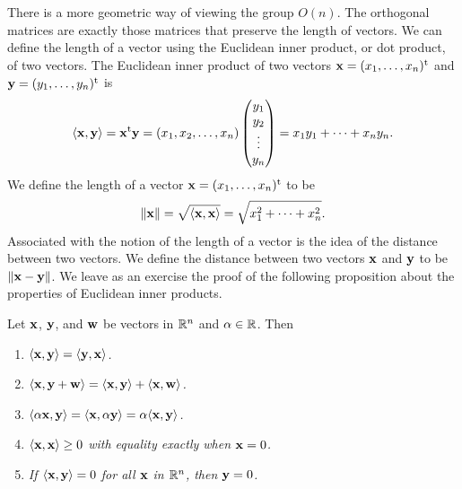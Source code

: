  
There is a more geometric way of viewing the group $O(n)$. The
orthogonal matrices are exactly those matrices that preserve the
length of vectors. We can define the length of a vector using the
{\bfi Euclidean inner product}, or
{\bfi dot product}, of two vectors. The Euclidean inner product of
two vectors ${\bold x}=(x_1, \ldots, x_n)^{\rm t}$ and ${\bold
y}=(y_1, \ldots, y_n)^{\rm t}$ is
\[
\langle  {\bold x}, {\bold y} \rangle
=
{\bold x}^{\rm t}  {\bold y}
=
(x_1, x_2, \ldots, x_n)
\begin{pmatrix}
y_1 \\ y_2 \\ \vdots \\ y_n
\end{pmatrix}
=
x_1 y_1 + \cdots + x_n y_n.
\]
We define the length of a vector ${\bold x}=(x_1, \ldots, x_n)^{\rm
t}$ to be 
\[
\| {\bold x} \|\label{notelengthvect} 
= \sqrt{\langle  {\bold x}, {\bold x} \rangle} 
= \sqrt{x_1^2 + \cdots + x_n^2}.
\]
Associated with the notion of the length of a vector is the idea of
the distance between two vectors. We define the {\bfi distance\/}
between two vectors ${\bold x}$ and ${\bold y}$ to be $\| {\bold
x}-{\bold y} \|$. We leave as an exercise the proof of the following
proposition about the properties of Euclidean inner products.  
 
 
\begin{proposition}
Let ${\bold x}$, ${\bold y}$, and ${\bold w}$ be vectors in ${\Bbb
R}^n$ and $\alpha \in {\Bbb R}$. Then 
\begin{enumerate}
 
\rm \item \it
$\langle {\bold x}, {\bold y} \rangle = \langle {\bold y}, {\bold x}
\rangle$. 
 
\rm \item \it
$\langle {\bold x}, {\bold y} + {\bold w} \rangle = \langle {\bold x},
{\bold y} \rangle + \langle {\bold x}, {\bold w} \rangle$.
 
\rm \item \it
$\langle \alpha {\bold x}, {\bold y} \rangle = \langle {\bold x},
\alpha {\bold y} \rangle = \alpha \langle  {\bold x}, {\bold y}
\rangle$. 
 
\rm \item \it
$\langle {\bold x}, {\bold x} \rangle \geq 0$ with equality exactly
when ${\bold x} = 0$. 
 
\rm \item \it
If $\langle {\bold x}, {\bold y} \rangle = 0$  for all ${\bold x}$ in
${\Bbb R}^n$, then ${\bold y} = 0$. 
 
\end{enumerate}
\end{proposition}
 
